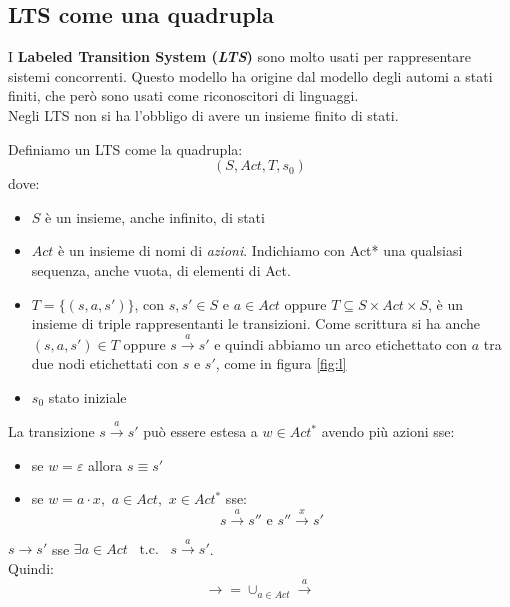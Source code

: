 \subsection{LTS come una quadrupla}
I \textbf{Labeled Transition System (\textit{LTS})} sono molto usati per
rappresentare sistemi concorrenti. Questo modello ha origine dal modello degli
automi a stati finiti, che però sono usati come riconoscitori di linguaggi.\\
Negli LTS non si ha l'obbligo di avere un insieme finito di stati.
\begin{definizione}
  Definiamo un LTS come la quadrupla:
  \[(S, Act, T, s_0)\]
  dove:
  \begin{itemize}
    \item $S$ è un insieme, anche infinito, di stati
    \item $Act$ è un insieme di nomi di \textit{azioni}. Indichiamo con Act* una qualsiasi sequenza, anche vuota, di elementi di Act.
    \item $T=\{(s, a, s')\}$, con $s, s'\in S$ e $a\in Act$ oppure $T\subseteq
    S\times Act\times S$, è un insieme di triple rappresentanti le
    transizioni. Come scrittura si ha anche $(s, a, s')\in T$ oppure
    $s\stackrel{a}{\rightarrow} s'$ e quindi abbiamo un arco etichettato con $a$ tra
    due nodi etichettati con $s$ e $s'$, come in figura \ref{fig:l}
    \item $s_0$ stato iniziale
  \end{itemize}
\end{definizione} \vspace{5mm} %
\begin{definizione} 
  La transizione $s\stackrel{a}{\rightarrow} s'$ può essere estesa a $w\in
  Act^*$ avendo più azioni sse:
  \begin{itemize}
    \item se $w=\varepsilon$ allora $s\equiv s'$
    \item se $w=a\cdot x,\,\, a\in Act,\,\, x\in Act^*$ sse:
    \[s\stackrel{a}{\rightarrow} s'' \mbox{ e } s''\stackrel{x}{\rightarrow}
      s'\]
  \end{itemize}
\end{definizione} \vspace{5mm} %
\begin{definizione}
  $s\rightarrow s'$ sse $\exists a \in Act\,\,\,\mbox{ t.c. }\,\,\,
  s\stackrel{a}{\rightarrow} s'$.\\
  Quindi:
  \[\rightarrow =\cup_{a\in Act}\stackrel{a}{\rightarrow}\]
\end{definizione} \vspace{5mm} %
